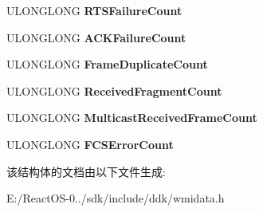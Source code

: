 \begin{DoxyCompactItemize}
\item 
\mbox{\label{struct___m_s_ndis__80211___statistics_a0fa241d01e44f380e46554a1328fd482}} 
U\+L\+O\+N\+G\+L\+O\+NG {\bfseries R\+T\+S\+Failure\+Count}
\item 
\mbox{\label{struct___m_s_ndis__80211___statistics_a78d67b630fc4162cad3acc61dc2a497c}} 
U\+L\+O\+N\+G\+L\+O\+NG {\bfseries A\+C\+K\+Failure\+Count}
\item 
\mbox{\label{struct___m_s_ndis__80211___statistics_a842314a793a9b5f5d9e66f64dca6c411}} 
U\+L\+O\+N\+G\+L\+O\+NG {\bfseries Frame\+Duplicate\+Count}
\item 
\mbox{\label{struct___m_s_ndis__80211___statistics_a71bd955270311011f0b5588923ab21a3}} 
U\+L\+O\+N\+G\+L\+O\+NG {\bfseries Received\+Fragment\+Count}
\item 
\mbox{\label{struct___m_s_ndis__80211___statistics_ab4bc9e45fde72c630bef4f09ca007b1e}} 
U\+L\+O\+N\+G\+L\+O\+NG {\bfseries Multicast\+Received\+Frame\+Count}
\item 
\mbox{\label{struct___m_s_ndis__80211___statistics_a5ba737056f5a65b554e7903ee652084f}} 
U\+L\+O\+N\+G\+L\+O\+NG {\bfseries F\+C\+S\+Error\+Count}
\end{DoxyCompactItemize}


该结构体的文档由以下文件生成\+:\begin{DoxyCompactItemize}
\item 
E\+:/\+React\+O\+S-\/0../sdk/include/ddk/wmidata.\+h\end{DoxyCompactItemize}
